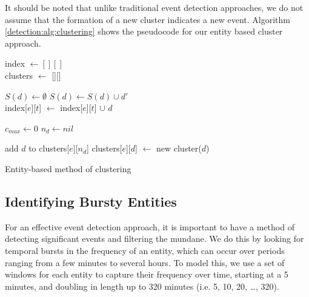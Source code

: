It should be noted that unlike traditional event detection approaches, we do not assume that the formation of a new cluster indicates a new event. Algorithm \ref{detection:alg:clustering} shows the pseudocode for our entity based cluster approach.

\begin{algorithm}
	\DontPrintSemicolon
	index $\gets [][]$ \\
	clusters $\gets$ [][] \\

 {

	 {

		$S(d) \gets \emptyset$ 
		 {
			 {
				$S(d) \gets S(d) \cup d'$ \\
			}
			index[$e$][$t$] $\gets$ index[$e$][$t$] $\cup$ $d$ \\
		}

		$c_{max} \gets 0$ 
		$n_{d} \gets nil$ 

		 {
			add $d$ to clusters[$e$][$n_d$]
		}{
			clusters[$e$][$d$] $\gets$ new cluster($d$) 
		}

	}
}

\caption{Entity-based method of clustering}
\label{detection:alg:clustering}
\end{algorithm}

\subsection{Identifying Bursty Entities}
For an effective event detection approach, it is important to have a method of detecting significant events and filtering the mundane. We do this by looking for temporal bursts in the frequency of an entity, which can occur over periods ranging from a few minutes to several hours. To model this, we use a set of windows for each entity to capture their frequency over time, starting at a 5 minutes, and doubling in length up to 320 minutes (i.e. 5, 10, 20, \ldots, 320).

